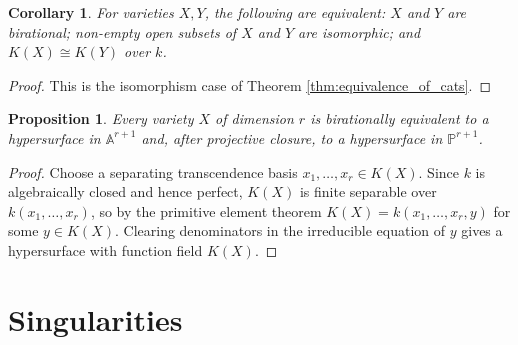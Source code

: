 \documentclass[12pt]{article}
\theoremstyle{plain}
\newtheorem{proposition}[thm]{Proposition}
\newtheorem{cor}[thm]{Corollary}
\theoremstyle{definition}
\newcommand{\bb}[1]{\mathbb{#1}}
\begin{document}
\begin{cor}\label{cor:function_field_birational}
For varieties $X,Y$, the following are equivalent: $X$ and $Y$ are birational; non-empty open subsets of $X$ and $Y$ are isomorphic; and $K(X)\cong K(Y)$ over $k$.
\end{cor}
\begin{proof}
This is the isomorphism case of Theorem \ref{thm:equivalence_of_cats}.
\end{proof}
\begin{proposition}\label{prop:hypersurface}
Every variety $X$ of dimension $r$ is birationally equivalent to a hypersurface in $\bb A^{r+1}$ and, after projective closure, to a hypersurface in $\bb P^{r+1}$.
\end{proposition}
\begin{proof}
Choose a separating transcendence basis $x_1,\ldots,x_r\in K(X)$. Since $k$ is algebraically closed and hence perfect, $K(X)$ is finite separable over $k(x_1,\ldots,x_r)$, so by the primitive element theorem $K(X)=k(x_1,\ldots,x_r,y)$ for some $y\in K(X)$. Clearing denominators in the irreducible equation of $y$ gives a hypersurface with function field $K(X)$.
\end{proof}

\section{Singularities}
\end{document}
